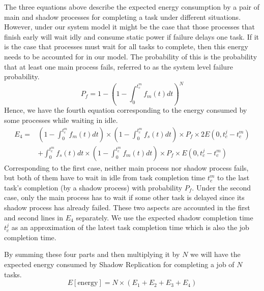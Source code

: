 The three equations above describe the expected energy consumption by a
pair of main and shadow processes for completing a task under
different situations. However, under our system model it might be the
case that those processes that finish early will wait idly and
consume static power if failure delays one task. If it is the case
that processes must wait for all tasks to complete, then this energy
needs to be accounted for in our model. The probability of this is the probability that at least one main process fails,
referred to as the system level failure probability.
\begin{equation}
P_f=1-(1-\int_0^{t_c^m}f_m(t)dt)^N
\label{eq:prob_of_one_main_failure}
\end{equation}
Hence, we have the fourth equation corresponding to the energy consumed  by some processes while waiting in idle. 
\begin{equation}
  \begin{split}
  E_4 = & ( 1-\int_0^{t_c^m}f_m(t)dt) \times (1 - \int_0^{t_c^m} f_s(t)dt) \times  P_f \times 2E(0,t_c^j-t_c^m)  \\ & + \int_0^{t_c^m}f_s(t)dt \times  (1-\int_0^{t_c^m}f_m(t)dt) \times P_f \times E(0,t_c^j-t_c^m) 
  \end{split}
\end{equation}
Corresponding to the first case, neither main process nor shadow
process fails, but both of them have to wait in idle from task
completion time $t_c^m$ to the last task's completion (by a shadow
process) with probability $P_f$. Under the second case, only the main
process has to wait if some other task is delayed since its shadow
process has already failed. These two aspects are accounted in the
first and second lines in $E_4$ separately.  We use the expected
shadow completion time $t_c^j$ as an approximation of the latest task
completion time which is also the job completion time.


By summing these four parts and then multiplying it by $N$ we will have
the expected energy consumed by Shadow Replication for completing a
job of $N$ tasks.
\begin{equation}
E[\text{energy}]=N \times (E_1 + E_2 + E_3 + E_4)
\label{eq:total_energy}
\end{equation}

